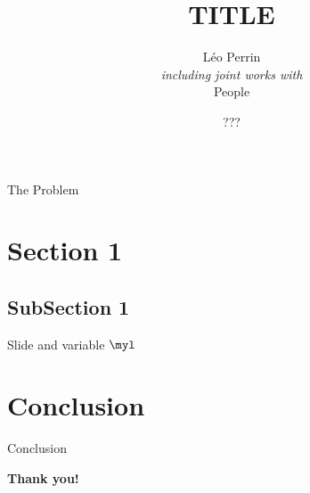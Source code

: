 \documentclass[presentation,aspectratio=1610]{beamer}
\title{TITLE}
\author[Léo Perrin]{Léo Perrin\inst{1} \\[1em]
	{\tiny
    \emph{including joint works with} \\ People
  }}
\institute{Inria, Paris}
\date{???}
\begin{document}
{
  \pagestyle{empty}

  \maketitle


  \begin{frame}{The Problem}
  \end{frame}
}


\tocStartsAppearingHere{}


\section{Section 1}

\subsection{SubSection 1}

\begin{frame}{Slide}
   and variable $\myl$
\end{frame}

\section{Conclusion}

\begin{frame}{Conclusion}
  \pause\vspace{1cm}
  
  \begin{center}
    \textbf{Thank you!}
  \end{center}
\end{frame}
\end{document}
